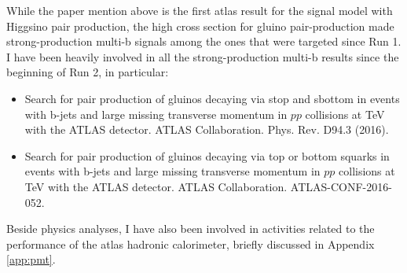 While the paper mention above is the first \gls{atlas} result for the signal model with Higgsino pair production, 
the high cross section for gluino pair-production made strong-production multi-b signals among the ones that were targeted since Run 1. 
I have been heavily involved in all the strong-production multi-b results since the beginning of Run 2, in particular:

\begin{itemize}
\item Search for pair production of gluinos decaying via stop and sbottom in events with b-jets and large missing transverse momentum in $pp$ collisions at \cmtre TeV with the ATLAS detector. ATLAS Collaboration. Phys. Rev. D94.3 (2016).
\item Search for pair production of gluinos decaying via top or bottom squarks in events with b-jets and large missing transverse momentum in
$pp$ collisions at \cmtre TeV with the ATLAS detector. ATLAS Collaboration. ATLAS-CONF-2016-052.
\end{itemize}

Beside physics analyses, I have also been involved in activities related to the performance of the \gls{atlas} hadronic calorimeter, 
briefly discussed in Appendix \ref{app:pmt}.



